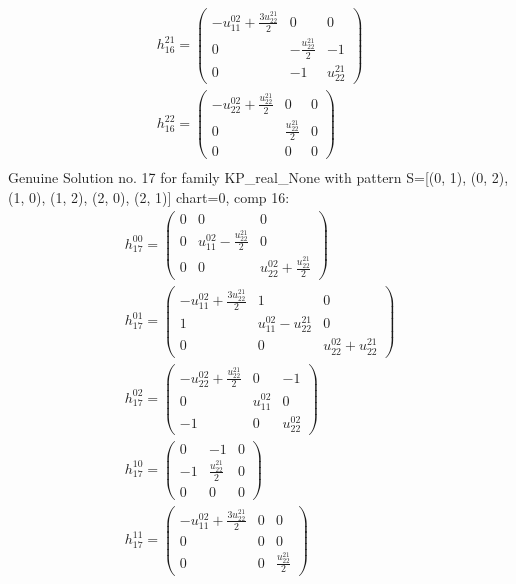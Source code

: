 \documentclass[a4paper, 11pt, twoside, onecolumn]{article}
\begin{document}
\begin{landscape}
\begin{gather*}
	 h_{16}^{21}=\begin{pmatrix}- u^{02}_{11} + \frac{3 u^{21}_{22}}{2} & 0 & 0\\0 & - \frac{u^{21}_{22}}{2} & -1\\0 & -1 & u^{21}_{22}\end{pmatrix}\\ 
	 h_{16}^{22}=\begin{pmatrix}- u^{02}_{22} + \frac{u^{21}_{22}}{2} & 0 & 0\\0 & \frac{u^{21}_{22}}{2} & 0\\0 & 0 & 0\end{pmatrix}\\ 
\end{gather*} 
Genuine Solution no. 17 for family KP_real_None with pattern S=[(0, 1), (0, 2), (1, 0), (1, 2), (2, 0), (2, 1)] chart=0, comp 16: 
\begin{gather*} 
	 h_{17}^{00}=\begin{pmatrix}0 & 0 & 0\\0 & u^{02}_{11} - \frac{u^{21}_{22}}{2} & 0\\0 & 0 & u^{02}_{22} + \frac{u^{21}_{22}}{2}\end{pmatrix}\\ 
	 h_{17}^{01}=\begin{pmatrix}- u^{02}_{11} + \frac{3 u^{21}_{22}}{2} & 1 & 0\\1 & u^{02}_{11} - u^{21}_{22} & 0\\0 & 0 & u^{02}_{22} + u^{21}_{22}\end{pmatrix}\\ 
	 h_{17}^{02}=\begin{pmatrix}- u^{02}_{22} + \frac{u^{21}_{22}}{2} & 0 & -1\\0 & u^{02}_{11} & 0\\-1 & 0 & u^{02}_{22}\end{pmatrix}\\ 
	 h_{17}^{10}=\begin{pmatrix}0 & -1 & 0\\-1 & \frac{u^{21}_{22}}{2} & 0\\0 & 0 & 0\end{pmatrix}\\ 
	 h_{17}^{11}=\begin{pmatrix}- u^{02}_{11} + \frac{3 u^{21}_{22}}{2} & 0 & 0\\0 & 0 & 0\\0 & 0 & \frac{u^{21}_{22}}{2}\end{pmatrix}\\ 

\end{gather*}
\end{landscape}
\end{document}

